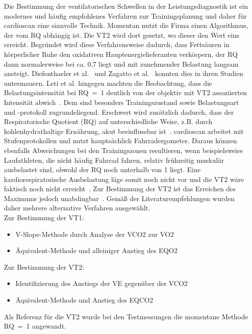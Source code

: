 Die Bestimmung der ventilatorischen Schwellen in der Leistungsdiagnostik ist ein modernes und häufig empfohlenes Verfahren zur Trainingsplanung und daher für cardioscan eine sinnvolle Technik. Momentan nutzt die Firma einen Algorithmus, der vom RQ abhängig ist. Die VT2 wird dort gesetzt, wo dieser den Wert eins erreicht. Begründet wird diese Verfahrensweise dadurch, dass Fettsäuren in körperlicher Ruhe den oxidativen Hauptenergielieferanten verkörpern, der RQ dann normalerweise bei ca. 0,7 liegt und mit zunehmender Belastung langsam ansteigt. Diefenthaeler et al.~\cite{Diefenthaeler.2017} und Zagatto et al.~\cite{Zagatto.2012} konnten dies in ihren Studien untermauern. Leti et al. hingegen machten die Beobachtung, dass die Belastungsintensität bei RQ~=~1 deutlich von der objektiv mit VT2 assoziierten Intensität abwich~\cite{Leti.2012}. Dem sind besonders Trainingszustand sowie Belastungsart und -protokoll zugrundeliegend. Erschwert wird zusätzlich dadurch, dass der Respiratorische Quotient (\acs{RQ}) auf unterschiedliche Weise, z.B. durch kohlenhydrathaltige Ernährung, akut beeinflussbar ist~\cite{ScharhagRosenberger.2010}. cardioscan arbeitet mit Stufenprotokollen und nutzt hauptsächlich Fahrradergometer. Daraus können ebenfalls Abweichungen bei den Trainingszonen resultieren, wenn beispielsweise Laufathleten, die nicht häufig Fahrrad fahren, relativ frühzeitig muskulär ausbelastet sind, obwohl der RQ noch unterhalb von 1 liegt. Eine kardiorespiratorische Ausbelastung läge somit noch nicht vor und die VT2 wäre faktisch noch nicht erreicht~\cite{Tzvetkov.2008}. Zur Bestimmung der VT2 ist das Erreichen des Maximums jedoch unabdingbar~\cite{ScharhagRosenberger.2013}. Gemäß der Literaturempfehlungen wurden daher mehrere alternative Verfahren ausgewählt.\\
Zur Bestimmung der VT1:
%
\begin{itemize}
	\item V-Slope-Methode durch Analyse der \acs{VCO2} zur \acs{VO2}
	\item Äquivalent-Methode und alleiniger Anstieg des \acs{EQO2}
\end{itemize}
%
Zur Bestimmung der VT2:
%
\begin{itemize}
	\item Identifizierung des Anstiegs der \acs{VE} gegenüber der \acs{VCO2}
	\item Äquivalent-Methode und Anstieg des \acs{EQCO2}
\end{itemize}
%
Als Referenz für die VT2 wurde bei den Testmessungen die momentane Methode RQ~=~1 angewandt.\\
